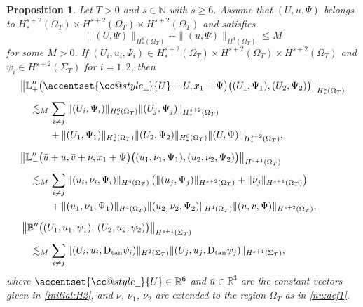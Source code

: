 \documentclass[twoside,11pt]{article}
\makeatletter
\numberwithin{equation}{section}
\newtheorem{proposition}[lemma]{Proposition}
\def\widebar{\accentset{{\cc@style\underline{\mskip10mu}}}}
\makeatother
\begin{document}
\begin{proposition}  \label{pro:tame2}
	Let $T>0$ and $s\in\mathbb{N}$ with $s\geq 6$.
	Assume that $(U,u,\Psi)$ belongs to $H_*^{s+2}(\Omega_{T})\times H^{s+2}(\Omega_{T})\times H^{s+2}(\Omega_T)$ and satisfies 	
	$$\|(U,\Psi)\|_{H_*^{6}(\Omega_{T})} +\|(u,\Psi)\|_{H^{4}(\Omega_{T})} \leq M$$ for some ${M}>0$.
	If $(U_i, u_i,\Psi_i)\in H_*^{s+2}(\Omega_{T})\times H^{s+2}(\Omega_{T})\times H^{s+2}(\Omega_T)$ and $ \psi_i\in  H^{s+2}(\Sigma_T)$ for $i=1,2$, then
	\begin{align*}
		&\big\|\mathbb{L}_+''\big(\widebar{U}+U ,x_1+{\Psi} \big) \big((U_1,\Psi_1),(U_2,\Psi_2) \big)\big\|_{H_*^s(\Omega_{T})}
		\\[1mm]
		& 	\hspace*{1em}	 \lesssim_{{M}} 		\sum_{i \neq j} \|(U_i,\Psi_i)\|_{H_*^{6}(\Omega_{T})}   \|(U_j,\Psi_j)\|_{H_*^{s+2}(\Omega_{T})}
		\\
		&\hspace*{3em}	+ 		\|(U_1,\Psi_1)\|_{H_*^{6}(\Omega_{T})} \|(U_2,\Psi_2)\|_{H_*^{6}(\Omega_{T})}		\| (U ,\Psi )\|_{H_*^{s+2}(\Omega_{T})}
		,
\\[2mm]
		&
		\big\|\mathbb{L}_-''\big(\bar{u}+u,\bar{v}+\nu, x_1+\Psi\big) \big((u_1,\nu_1, \Psi_1),(u_2,\nu_2,\Psi_2) \big)\big\|_{H^{s+1}(\Omega_{T})}
		\\[1mm]
		&\hspace*{1em} \lesssim_{{M}}
		\sum_{i\neq j} \|(u_i,\nu_i,\Psi_i)\|_{H^{4}(\Omega_{T})}   \left( \|(u_j,\Psi_j)\|_{H^{s+2}(\Omega_{T})}+\|\nu_j \|_{H^{s+1}(\Omega_{T})}		\right)
		\\
		&\hspace*{3em}	+	
				\|(u_1,\nu_1,\Psi_1)\|_{H^{4}(\Omega_{T})} \|(u_2,\nu_2,\Psi_2)\|_{H^{4}(\Omega_{T})} 			 \| (u,v, {\Psi})\|_{H^{s+2}(\Omega_{T})}
		,
\\[2mm]
		&		\left\| \mathbb{B} '' \big((U_1,u_1,\psi_1),\, (U_2,u_2,\psi_2) \big)  \right\|_{H^{s+1}(\Sigma_{T})}	\\[1mm]
		&	
		\hspace*{1em} \lesssim_{{M}}
		\sum_{i\neq j} \|(U_i,u_i,\mathrm{D}_{\rm tan}\psi_i)\|_{H^{2}(\Sigma_T)}		
		\|(U_j,u_j,\mathrm{D}_{\rm tan}\psi_j)\|_{H^{s+1}(\Sigma_T)},
	\end{align*}
	where $\widebar{U}\in\mathbb{R}^6$ and $\bar{u}\in\mathbb{R}^3$ are the constant vectors given in \eqref{initial:H2}, and $\nu$, $\nu_1$, $\nu_2$ are extended to the region $\Omega_{T}$ as in \eqref{nu:def1}.
\end{proposition}
\end{document}
